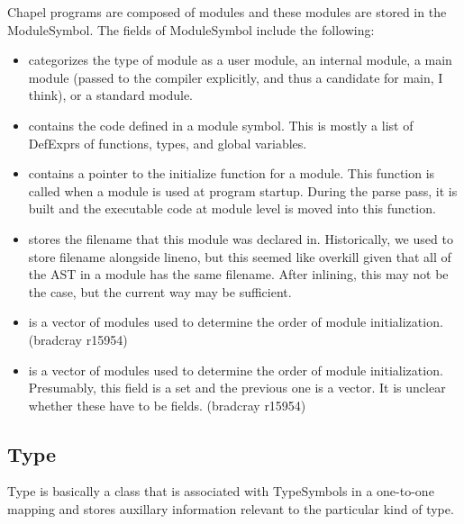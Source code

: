 \documentclass[10pt]{article}
\begin{document}
Chapel programs are composed of modules and these modules are stored
in the ModuleSymbol.  The fields of ModuleSymbol include the
following:
\begin{itemize}
\item {} categorizes the type of module as a user
  module, an internal module, a main module (passed to the compiler
  explicitly, and thus a candidate for main, I think), or a standard
  module.
\item {} contains the code defined in a module
  symbol.  This is mostly a list of DefExprs of functions, types, and
  global variables.
\item {} contains a pointer to the initialize
  function for a module.  This function is called when a module is
  used at program startup.  During the parse pass, it is built and the
  executable code at module level is moved into this function.
\item {} stores the filename that this module
  was declared in.  Historically, we used to store filename alongside
  lineno, but this seemed like overkill given that all of the AST in a
  module has the same filename.  After inlining, this may not be the
  case, but the current way may be sufficient.
\item {} is a vector of modules used
  to determine the order of module initialization. (bradcray r15954)
\item {} is a vector of modules used to
  determine the order of module initialization.  Presumably, this
  field is a set and the previous one is a vector.  It is unclear
  whether these have to be fields. (bradcray r15954)
\end{itemize}

\subsection{Type}

Type is basically a class that is associated with TypeSymbols in a
one-to-one mapping and stores auxillary information relevant to the
particular kind of type.
\end{document}
